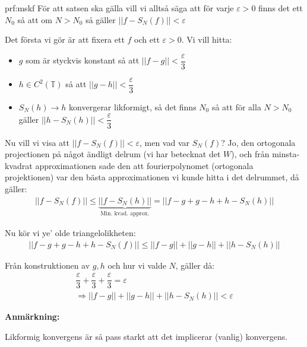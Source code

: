 \begin{prf}{prf:mskf}
  För att satsen ska gälla vill vi alltså säga att för varje $\varepsilon>0$ finns det ett $N_0$ så att om $N>N_0$ så gäller $\left|\left|f-S_N(f)\right|\right|<\varepsilon$
  \par\bigskip
  \noindent Det första vi gör är att fixera ett $f$ och ett $\varepsilon>0$. Vi vill hitta:\par
  \begin{itemize}
    \item$g$ som är styckvis konstant så att $\left|\left|f-g\right|\right|<\dfrac{\varepsilon}{3}$
    \item$h\in C^2(\mathbb{T})$ så att $\left|\left|g-h\right|\right|<\dfrac{\varepsilon}{3}$
    \item $S_N(h)\to h$ konvergerar likformigt, så det finns $N_0$  så att för alla $N>N_0$ gäller $\left|\left|h-S_N(h)\right|\right|<\dfrac{\varepsilon}{3}$
  \end{itemize}
  \par\bigskip
  \noindent Nu vill vi visa att $\left|\left|f-S_N(f)\right|\right|<\varepsilon$, men vad var $S_N(f)$? Jo, den ortogonala projectionen på något ändligt delrum (vi har betecknat det $W$), och från minsta-kvadrat approximationen sade den att fourierpolynomet (ortogonala projektionen) var den bästa approximationen vi kunde hitta i det delrummet, då gäller:
  \begin{equation*}
    \begin{gathered}
      \left|\left|f-S_N(f)\right|\right|\leq \underbrace{\left|\left|f-S_N(h)\right|\right|}_{\text{Min. kvad. approx.}} = \left|\left|f-g+g-h+h-S_N(h)\right|\right|
    \end{gathered}
  \end{equation*}
  \par\bigskip
  \noindent Nu kör vi ye' olde triangelolikheten:
  \begin{equation*}
    \begin{gathered}
      \left|\left|f-g+g-h+h-S_N(f)\right|\right|\leq \left|\left|f-g\right|\right|+\left|\left|g-h\right|\right| + \left|\left|h-S_N(h)\right|\right|
    \end{gathered}
  \end{equation*}
  \par\bigskip
  \noindent Från konstruktionen av $g,h$ och hur vi valde $N$, gäller då:
  \begin{equation*}
    \begin{gathered}
      \dfrac{\varepsilon}{3} +\dfrac{\varepsilon}{3}+\dfrac{\varepsilon}{3} = \varepsilon\\
      \Rightarrow\left|\left|f-g\right|\right|+\left|\left|g-h\right|\right| + \left|\left|h-S_N(h)\right|\right|<\varepsilon
    \end{gathered}
  \end{equation*}
\end{prf}
\par\bigskip
\noindent\textbf{Anmärkning:}\par
\noindent Likformig konvergens är så pass starkt att det implicerar (vanlig) konvergens.
\par\bigskip
